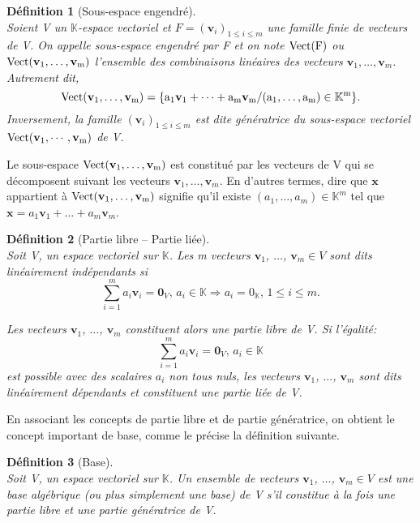 \documentclass[11pt,a4paper,oneside]{book}
\newtheorem{defi}{Définition}[chapter]
\def\K{\mathbb K}
\def\v{\mathbf v}
\def\x{\mathbf x}
\def\spam{\rm Vect}
\newcommand{\mbf}[1]{\mathbf{#1}}
\begin{document}
\begin{defi}[Sous-espace engendré]\label{Déf2.6}
	\emph{\\}
Soient V un $ \K $-espace vectoriel et $ F=(\v_{i})_{1\leq i\leq m} $ une famille
finie de vecteurs de V. On appelle sous-espace engendré par F et on
note $ \spam(F) $ ou $ \spam(\v_{1},\dots, \v_{m}) $  l'ensemble des combinaisons linéaires des
vecteurs $ \v_{1},\dots, \v_{m} $. Autrement dit,
\begin{equation}
\spam(\v_{1},\dots, \v_{m})=\{a_{1}\v_{1}+\cdots+a_{m}\v_{m}/(a_{1},\dots,a_{m})\in\K^{m}\}.
\end{equation}
Inversement, la famille $ (\v_{i})_{1\leq i\leq m} $ est dite génératrice du sous-espace vectoriel
$  \spam(\v_{1},\cdots, \v_{m}) $ de V.
\end{defi} 
Le sous-espace $\spam(\v_{1},\dots, \v_{m}) $ est constitué par les vecteurs de V qui
se décomposent suivant les vecteurs $\v_{1},\dots, \v_{m}$. En d'autres termes, dire que $ \x $
appartient à $\spam(\v_{1},\dots, \v_{m}) $ signifie qu'il existe $(a_{1},\dots,a_{m})\in\K^{m} $ tel que $ \x=a_{1}\v_{1}+\dots+a_{m}\v_{m} $. 
\begin{defi}[Partie libre – Partie liée]
	\emph{\\}
	Soit V, un espace vectoriel sur $ \K $. Les m vecteurs $ \v_{1} $, $\dots$, $ \v_{m}\in V $ sont dits
	linéairement indépendants si
	\begin{equation}
		\sum_{i=1}^{m}a_{i}\v_{i}=\mbf{0}_{V},\, a_{i}\in \K\Rightarrow a_{i}=0_{\K},\, 1\leq i\leq m.
	\end{equation}
	
	Les vecteurs $ \v_{1} $, $\dots$, $ \v_{m}$ constituent alors une partie libre de V. Si l'égalité:
	\begin{equation}
		\sum_{i=1}^{m}a_{i}\v_{i}=\mbf{0}_{V},\, a_{i}\in \K
	\end{equation}
	est possible avec des scalaires $ a_{i} $ non tous nuls, les vecteurs $ \v_{1} $, $\dots$, $ \v_{m}$ sont dits linéairement dépendants et constituent une partie liée de V.
\end{defi}
En associant les concepts de partie libre et de partie génératrice, on obtient le concept important de
base, comme le précise la définition suivante.
\begin{defi}[Base]
	\emph{\\}
	Soit V, un espace vectoriel sur $\K$. Un ensemble de vecteurs $ \v_{1} $, $\dots$, $ \v_{m}\in V$ est une
	base algébrique (ou plus simplement une
	base) de V s'il constitue à la fois une partie libre et une partie génératrice de V.
\end{defi}
\end{document}
